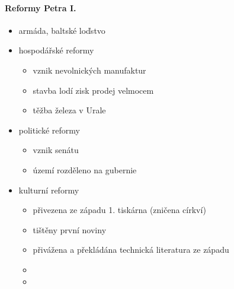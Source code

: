 \paragraph{Reformy Petra I.}
\begin{itemize}
\item armáda, baltské loďstvo
\item hospodářské reformy
	\begin{itemize}
	\item vznik nevolnických manufaktur
	\item stavba lodí \ra zisk \ra prodej velmocem
	\item těžba železa v Urale
	\end{itemize}
\item politické reformy
	\begin{itemize}
	\item vznik senátu
	\item území rozděleno na gubernie
	\end{itemize}
\item kulturní reformy
	\begin{itemize}
	\item přivezena ze západu 1. tiskárna (zničena církví)
	\item tištěny první noviny
	\item přivážena a překládána technická literatura ze západu
	\item {}
	\item {}
	\end{itemize}
\end{itemize}

